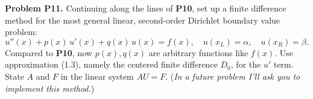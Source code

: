 \documentclass[12pt]{amsart}
\newcommand{\prob}[1]{\bigskip\noindent\textbf{#1}\quad }
\begin{document}
\prob{Problem P11.}  Continuing along the lines of \textbf{P10}, set up a finite difference method for the most general linear, second-order Dirichlet boundary value problem:
\begin{equation*}
u''(x) + p(x)\, u'(x) + q(x)\, u(x) = f(x), \quad u(x_L) = \alpha, \quad u(x_R) = \beta.
\end{equation*}
Compared to \textbf{P10}, now $p(x),q(x)$ are arbitrary functions like $f(x)$.  Use approximation (1.3), namely the centered finite difference $D_0$, for the $u'$ term.  State $A$ and $F$ in the linear system $AU=F$.  (\emph{In a future problem I'll ask you to implement this method.})
\end{document}
